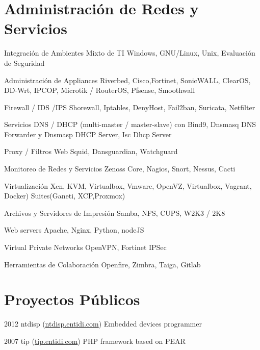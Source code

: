 \documentclass{tccv}
\begin{document}
\section{Administraci\'on de Redes y Servicios}
\begin{servicios}
\item{}
     {Integraci\'on de   Ambientes Mixto de TI}
     {Windows, GNU/Linux, Unix, Evaluación de Seguridad}
\item{}
     {Administraci\'on de Appliances}
     {Riverbed, Cisco,Fortinet, SonicWALL, ClearOS, DD-Wrt, IPCOP, Microtik / RouterOS, Pfsense, Smoothwall}
\item{}
     {Firewall / IDS /IPS}
     {Shorewall, Iptables, DenyHost, Fail2ban, Suricata, Netfilter}
\item{}
     {Servicios DNS / DHCP}
     {(multi-master / master-slave) con Bind9, Dnsmasq DNS Forwarder y Dnsmasp DHCP Server, Isc Dhcp Server}
\item{}
     {Proxy / Filtros Web}
     {Squid, Dansguardian, Watchguard}
\item{}
     {Monitoreo de Redes y Servicios}
     {Zenoss Core, Nagios, Snort, Nessus, Cacti}
\item{}
     {Virtualizaci\'on}
     {Xen, KVM, Virtualbox, Vmware, OpenVZ, Virtualbox, Vagrant, Docker) Suites(Ganeti, XCP,Proxmox)}
\item{}
{Archivos y Servidores de Impresi\'on}
     {Samba, NFS, CUPS, W2K3 / 2K8}
\item{}
     {Web servers}
     {Apache, Nginx, Python, nodeJS}
\item{}
     {Virtual Private Networks}
     {OpenVPN, Fortinet IPSec}
\item{}
     {Herramientas de Colaboraci\'on}
     {Openfire, Zimbra, Taiga, Gitlab}
\end{servicios}

\section{Proyectos P\'ublicos}

\begin{proyectos}

\item{2012}
     {ntdisp (\href{http://ntdisp.entidi.com/}{ntdisp.entidi.com})}
     {Embedded devices programmer}

\item{2007}
     {tip (\href{http://tip.entidi.com/}{tip.entidi.com})}
     {PHP framework based on PEAR}

\end{proyectos}
\end{document}
